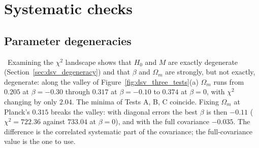 \section{Systematic checks}\label{sec:dsv_systematics}
\subsection{Parameter degeneracies}
\calc\ Examining the $\chi^2$ landscape shows that $H_0$ and $M$ are exactly degenerate (Section~\ref{sec:dsv_degeneracy}) and that $\beta$ and $\Omega_m$
are strongly, but not exactly, degenerate: along the valley of Figure~\ref{fig:dsv_three_tests}(a) $\Omega_m$ runs from $0.205$ at $\beta=-0.30$ through
$0.317$ at $\beta=-0.10$ to $0.374$ at $\beta=0$, with $\chi^2$ changing by only $2.04$. The minima of Tests A, B, C coincide. Fixing $\Omega_m$ at
Planck's $0.315$ breaks the valley: with diagonal errors the best $\beta$ is then $-0.11$ ($\chi^2=722.36$ against $733.04$ at $\beta=0$), and with the
full covariance $-0.035$. The difference is the correlated systematic part of the covariance; the full-covariance value is the one to use.

